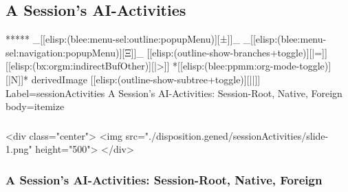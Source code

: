 \begin{whenOrg}
\section{A Session's AI-Activities}

\begin{whenOrg}
*****  _[[elisp:(blee:menu-sel:outline:popupMenu)][±]]_ _[[elisp:(blee:menu-sel:navigation:popupMenu)][Ξ]]_ [[elisp:(outline-show-branches+toggle)][|=]] [[elisp:(bx:orgm:indirectBufOther)][|>]] *[[elisp:(blee:ppmm:org-mode-toggle)][|N]]*  derivedImage [[elisp:(outline-show-subtree+toggle)][||]] Label=sessionActivities A Session's AI-Activities: Session-Root, Native, Foreign body=itemize
\end{whenOrg}

\begin{htmlonly}

\begin{frame}[fragile,plain,label=sessionActivities]
    \frametitle{}
    \framesubtitle{}
    \begin{rawhtml}
<div class="center">
<img src="./disposition.gened/sessionActivities/slide-1.png" height="500">
</div>
    \end{rawhtml}
\end{frame}
\end{htmlonly}

\begin{verblatex}

\begin{frame}[fragile,plain,label=sessionActivities]
    \frametitle{A Session's AI-Activities: Session-Root, Native, Foreign}
    \framesubtitle{}


\end{frame}
\end{verblatex}
\end{whenOrg}
